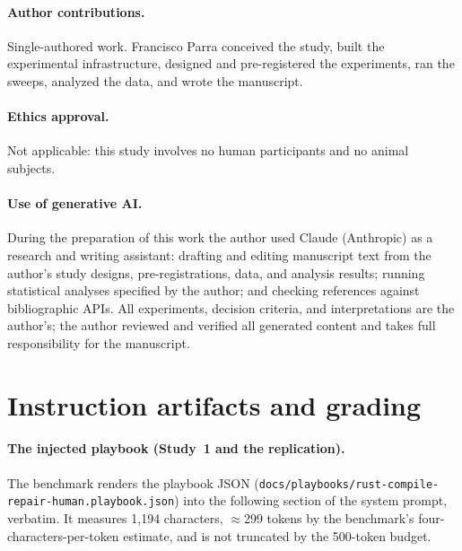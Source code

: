 \documentclass[smallcondensed,natbib]{svjour3}
\begin{document}
\paragraph{Author contributions.} Single-authored work. Francisco
Parra conceived the study, built the experimental infrastructure,
designed and pre-registered the experiments, ran the sweeps, analyzed
the data, and wrote the manuscript.

\paragraph{Ethics approval.} Not applicable: this study involves no
human participants and no animal subjects.

\paragraph{Use of generative AI.} During the preparation of this
work the author used Claude (Anthropic) as a research and writing
assistant: drafting and editing manuscript text from the author's
study designs, pre-registrations, data, and analysis results; running
statistical analyses specified by the author; and checking references
against bibliographic APIs. All experiments, decision criteria, and
interpretations are the author's; the author reviewed and verified
all generated content and takes full responsibility for the
manuscript.




\appendix
\section{Instruction artifacts and grading}\label{app:artifacts}

\paragraph{The injected playbook (Study~1 and the replication).} The
benchmark renders the playbook JSON
(\texttt{docs/playbooks/rust-compile-repair-human.playbook.json}) into
the following section of the system prompt, verbatim. It measures
1{,}194 characters, $\approx$299 tokens by the benchmark's
four-characters-per-token estimate, and is not truncated by the
500-token budget.
\end{document}
